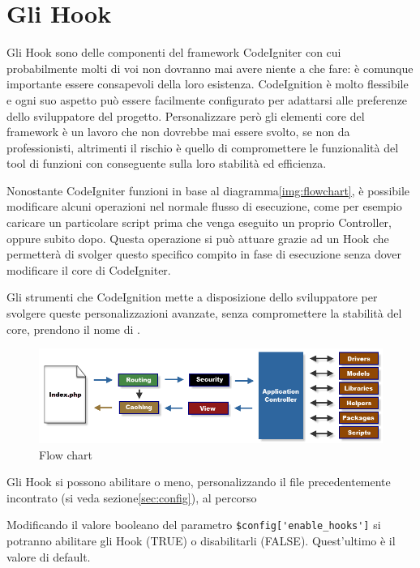 \chapter{Gli Hook}
\label{cap:hook}

Gli Hook sono delle componenti del framework CodeIgniter con cui probabilmente molti di voi non dovranno mai avere niente a che fare: è comunque importante essere consapevoli della loro esistenza. CodeIgnition è molto flessibile e ogni suo aspetto può essere facilmente configurato per adattarsi alle preferenze dello sviluppatore del progetto. Personalizzare però gli elementi core del framework è un lavoro che non dovrebbe mai essere svolto, se non da professionisti, altrimenti il rischio è quello di compromettere le funzionalità del tool di funzioni con conseguente sulla loro stabilità ed efficienza.
 
Nonostante CodeIgniter funzioni in base al diagramma\vref{img:flowchart}, è possibile modificare alcuni operazioni nel normale flusso di esecuzione, come per esempio caricare un particolare script prima che venga eseguito un proprio Controller, oppure subito dopo. Questa operazione si può attuare grazie ad un Hook che permetterà di svolger questo specifico compito in fase di esecuzione senza dover modificare il core di CodeIgniter.

Gli strumenti che CodeIgnition mette a disposizione dello sviluppatore per svolgere queste personalizzazioni avanzate, senza compromettere la stabilità del core, prendono il nome di .

\begin{figure}
\centering
\includegraphics[width=0.7\linewidth]{img/10}
\caption[]{Flow chart}
\label{fig:flowchart}
\end{figure}

Gli Hook si possono abilitare o meno, personalizzando il file  precedentemente incontrato (si veda sezione\vref{sec:config}), al percorso 

Modificando il valore booleano del parametro \verb|$config['enable_hooks']| si potranno abilitare gli Hook (TRUE) o disabilitarli (FALSE). Quest'ultimo è il valore di default.

